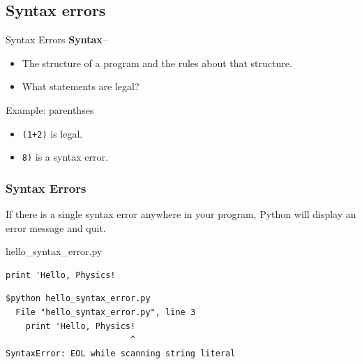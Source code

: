 \documentclass{beamer}
\begin{document}
\subsection{Syntax errors}
\begin{frame}{Syntax Errors}
\textbf{Syntax}--
\begin{itemize}
\item The structure of a program and the rules about that structure.
\item What statements are legal?
\end{itemize}
\begin{block}{Example: parenthses}
\begin{itemize}
\item \texttt{(1+2)} is legal.
\item \texttt{8)} is a \alert{syntax error}.
\end{itemize}
\end{block}
\end{frame}

\begin{frame}[fragile]
\frametitle{Syntax Errors}
If there is a \alert{single syntax error} anywhere in your program, Python will display an error message and quit.
\begin{block}{hello\_syntax\_error.py}
\begin{verbatim}
print 'Hello, Physics!
\end{verbatim}
\end{block}\pause
\begin{block}{}
\begin{verbatim}
$python hello_syntax_error.py 
  File "hello_syntax_error.py", line 3
    print 'Hello, Physics!
                         ^
SyntaxError: EOL while scanning string literal
\end{verbatim}
\end{block}
\end{frame}
%
%
%
%
%
\end{document}

